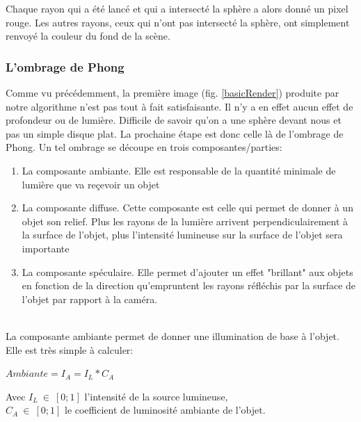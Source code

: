 \documentclass[11pt]{article}
\begin{document}
Chaque rayon qui a été lancé et qui a intersecté la sphère a alors donné un pixel rouge. Les autres rayons, ceux qui n'ont pas intersecté la sphère, ont simplement renvoyé la couleur du fond de la scène. 

\subsubsection{L'ombrage de Phong}

Comme vu précédemment, la première image (fig. \ref{basicRender}) produite par notre algorithme n'est pas tout à fait satisfaisante. Il n'y a en effet aucun effet de profondeur ou de lumière. Difficile de savoir qu'on a une sphère devant nous et pas un simple disque plat. La prochaine étape est donc celle là de l'ombrage de Phong. Un tel ombrage se découpe en trois composantes/parties:
\begin{enumerate}
	\item{La composante ambiante. Elle est responsable de la quantité minimale de lumière que va reçevoir un objet}
	\item{La composante diffuse. Cette composante est celle qui permet de donner à un objet son relief. Plus les rayons de la lumière arrivent perpendiculairement à la surface de l'objet, plus l'intensité lumineuse sur la surface de l'objet sera importante}
	\item{La composante spéculaire. Elle permet d'ajouter un effet "brillant" aux objets en fonction de la direction qu'empruntent les rayons réfléchis par la surface de l'objet par rapport à la caméra.}
\end{enumerate}

\hfill\\
\indent La composante ambiante permet de donner une illumination de base à l'objet. Elle est très simple à calculer:\\

\begin{center}
	$Ambiante = I_A = I_L*C_A$
\end{center}
Avec $I_L\ \in\ [0;1]$ l'intensité de la source lumineuse,\\
$C_A\ \in\ [0; 1]$ le coefficient de luminosité ambiante de l'objet.
\end{document}
